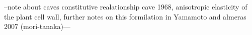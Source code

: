 --note about caves constitutive realationship cave 1968, anisotropic
elasticity of the plant cell wall, further notes on this formilation in Yamamoto
and almeras 2007 (mori-tanaka)---